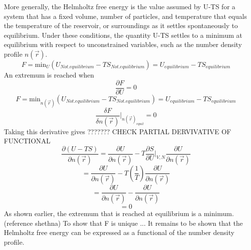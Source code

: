 \documentclass[12pt]{article}
\begin{document}
More generally, the Helmholtz free energy is the value assumed by U-TS for a system that has a fixed volume, number of particles, and temperature that equals the temperature of the reservoir, or surroundings as it settles spontaneously to equilibrium. Under these conditions, the quantity U-TS settles to a minimum at equilibrium with respect to unconstrained variables, such as the number density profile $n(\vec r)$.
\begin{equation}F=\text{min}_{U}(U_{Not.equilibrium} - TS_{Not.equilibrium}) = U_{equilibrium}-TS_{equilibrium}\end{equation}
An extremum is reached when
\begin{equation}\frac{\partial{F}}{\partial{U}}=0\end{equation}
\color{red} 
\begin{equation}F=\text{min}_{n(\vec{r})}(U_{Not.equilibrium} - TS_{Not.equilibrium}) = U_{equilibrium}-TS_{equilibrium}\end{equation} 
\color{red} 
\begin{equation}\frac{\delta{F}}{\delta{n(\vec r)}}\bigg|_{n(\vec{r})_{equil}}=0\end{equation}
Taking this derivative gives  ??????? CHECK PARTIAL DERVIVATIVE OF FUNCTIONAL 
\begin{equation}\frac{\partial{(U-TS)}}{\partial{n(\vec r)}}=\frac{\partial{U}}{\partial{n(\vec r)}}-T\frac{\partial{S}}{\partial{U}}\bigg|_{V,N}\frac{\partial{U}}{\partial{n(\vec r)}}\end{equation}
\begin{equation}=\frac{\partial{U}}{\partial{n(\vec r)}}-T\left(\frac{1}{T}\right)\frac{\partial{U}}{\partial{n(\vec r)}}\end{equation}
\begin{equation}=\frac{\partial{U}}{\partial{n(\vec r)}}-\frac{\partial{U}}{\partial{n(\vec r)}}\end{equation}
\begin{equation}=0\end{equation}
\color{black}
As shown earlier, the extremum that is reached at equilibrium is a minimum. (reference shethna) %
\color{red} To show that F is unique ... \color{black} 
It remains to be shown that the Helmholtz free energy can be expressed as a functional of the number density profile.
\end{document}
